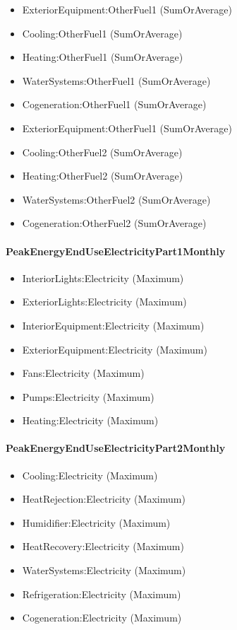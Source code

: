 \begin{itemize}
\item
  ExteriorEquipment:OtherFuel1 (SumOrAverage)
\item
  Cooling:OtherFuel1 (SumOrAverage)
\item
  Heating:OtherFuel1 (SumOrAverage)
\item
  WaterSystems:OtherFuel1 (SumOrAverage)
\item
  Cogeneration:OtherFuel1 (SumOrAverage)
\item
  ExteriorEquipment:OtherFuel1 (SumOrAverage)
\item
  Cooling:OtherFuel2 (SumOrAverage)
\item
  Heating:OtherFuel2 (SumOrAverage)
\item
  WaterSystems:OtherFuel2 (SumOrAverage)
\item
  Cogeneration:OtherFuel2 (SumOrAverage)
\end{itemize}

\paragraph{PeakEnergyEndUseElectricityPart1Monthly}\label{peakenergyenduseelectricitypart1monthly}

\begin{itemize}
\item
  InteriorLights:Electricity (Maximum)
\item
  ExteriorLights:Electricity (Maximum)
\item
  InteriorEquipment:Electricity (Maximum)
\item
  ExteriorEquipment:Electricity (Maximum)
\item
  Fans:Electricity (Maximum)
\item
  Pumps:Electricity (Maximum)
\item
  Heating:Electricity (Maximum)
\end{itemize}

\paragraph{PeakEnergyEndUseElectricityPart2Monthly}\label{peakenergyenduseelectricitypart2monthly}

\begin{itemize}
\item
  Cooling:Electricity (Maximum)
\item
  HeatRejection:Electricity (Maximum)
\item
  Humidifier:Electricity (Maximum)
\item
  HeatRecovery:Electricity (Maximum)
\item
  WaterSystems:Electricity (Maximum)
\item
  Refrigeration:Electricity (Maximum)
\item
  Cogeneration:Electricity (Maximum)
\end{itemize}

